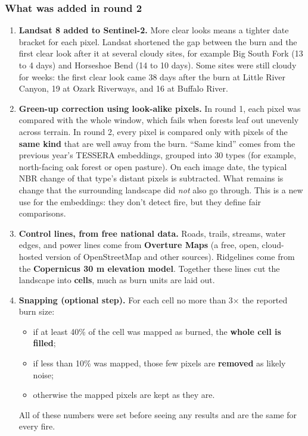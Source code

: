 \documentclass[
]{article}
\providecommand{\tightlist}{%
  \setlength{\itemsep}{0pt}\setlength{\parskip}{0pt}}
\begin{document}
\subsubsection{What was added in round
2}\label{what-was-added-in-round-2}

\begin{enumerate}
\def\labelenumi{\arabic{enumi}.}
\tightlist
\item
  \textbf{Landsat 8 added to Sentinel-2.} More clear looks means a
  tighter date bracket for each pixel. Landsat shortened the gap between
  the burn and the first clear look after it at several cloudy sites,
  for example Big South Fork (13 to 4 days) and Horseshoe Bend (14 to 10
  days). Some sites were still cloudy for weeks: the first clear look
  came 38 days after the burn at Little River Canyon, 19 at Ozark
  Riverways, and 16 at Buffalo River.
\item
  \textbf{Green-up correction using look-alike pixels.} In round 1, each
  pixel was compared with the whole window, which fails when forests
  leaf out unevenly across terrain. In round 2, every pixel is compared
  only with pixels of the \textbf{same kind} that are well away from the
  burn. ``Same kind'' comes from the previous year's TESSERA embeddings,
  grouped into 30 types (for example, north-facing oak forest or open
  pasture). On each image date, the typical NBR change of that type's
  distant pixels is subtracted. What remains is change that the
  surrounding landscape did \emph{not} also go through. This is a new
  use for the embeddings: they don't detect fire, but they define fair
  comparisons.
\item
  \textbf{Control lines, from free national data.} Roads, trails,
  streams, water edges, and power lines come from \textbf{Overture Maps}
  (a free, open, cloud-hosted version of OpenStreetMap and other
  sources). Ridgelines come from the \textbf{Copernicus 30 m elevation
  model}. Together these lines cut the landscape into \textbf{cells},
  much as burn units are laid out.
\item
  \textbf{Snapping (optional step).} For each cell no more than 3× the
  reported burn size:

  \begin{itemize}
  \tightlist
  \item
    if at least 40\% of the cell was mapped as burned, the \textbf{whole
    cell is filled};
  \item
    if less than 10\% was mapped, those few pixels are \textbf{removed}
    as likely noise;
  \item
    otherwise the mapped pixels are kept as they are.
  \end{itemize}

  All of these numbers were set before seeing any results and are the
  same for every fire.
\end{enumerate}
\end{document}

